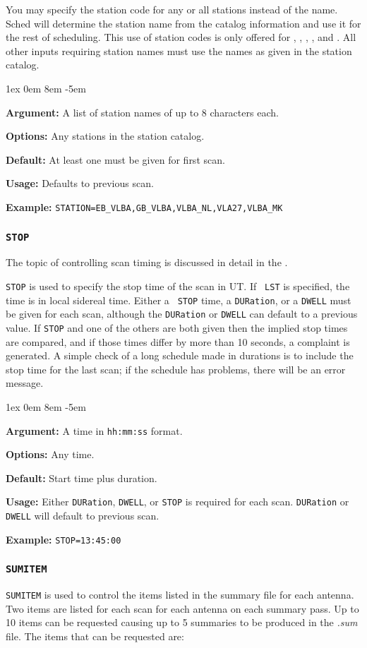 \documentclass{report}
\newcommand{\rcwbox}[5]{
  \begin{list}{}{\parsep 1ex  \itemsep 0em
                 \leftmargin 8em  \itemindent -5em }
    \item {\bf Argument:} #1
    \item {\bf Options:}  #2
    \item {\bf Default:}  #3
    \item {\bf Usage:}    #4
    \item {\bf Example:}  #5
  \end{list}
}
\begin{document}
You may specify the station code for any or all stations instead of
the name.  Sched will determine the station name from the catalog
information and use it for the rest of scheduling.  This use of
station codes is only offered for ,
, ,
, and .
All other inputs requiring station names must use the names as given
in the station catalog.

\rcwbox
{A list of station names of up to 8 characters each.}
{Any stations in the station catalog.}
{At least one must be given for first scan.}
{Defaults to previous scan.}
{{\tt STATION=EB\_VLBA,GB\_VLBA,VLBA\_NL,VLA27,VLBA\_MK}}


\subsubsection{\label{MP:STOP}{\tt STOP}}

The topic of controlling scan timing is discussed in detail in
the .

{\tt STOP} is used to specify the stop time of the scan in UT. If {\tt
LST} is specified, the time is in local sidereal time. Either a {\tt
STOP} time, a {\tt DURation}, or a {\tt DWELL} must be given for each
scan, although the {\tt DURation} or {\tt DWELL} can default to a
previous value. If {\tt STOP} and one of the others are both given
then the implied stop times are compared, and if those times differ by
more than 10 seconds, a complaint is generated. A simple check of
a long schedule made in durations is to include the stop time for the
last scan; if the schedule has problems, there will be an error
message.

\rcwbox
{A time in {\tt hh:mm:ss} format.}
{Any time.}
{Start time plus duration.}
{Either {\tt DURation}, {\tt DWELL}, or {\tt STOP} is required for
each scan. {\tt DURation} or {\tt DWELL} will default to previous scan.}
{{\tt STOP=13:45:00}}

\subsubsection{\label{MP:SUMITEM}{\tt SUMITEM}}

{\tt SUMITEM} is used to control the items listed in the summary file
for each antenna.  Two items are listed for each scan for each antenna
on each summary pass.  Up to 10 items can be requested causing
up to 5 summaries to be produced in the {\sl .sum} file.  The items
that can be requested are:
\end{document}
